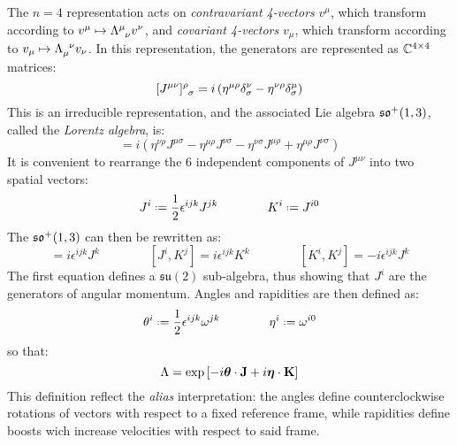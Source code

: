 The $ n = 4 $ representation acts on \textit{contravariant 4-vectors} $ v^\mu $, which transform according to $ v^\mu \mapsto \tensor{\Lambda}{^\mu_\nu} v^\nu $, and \textit{covariant 4-vectors} $ v_\mu $, which transform according to $ v_\mu \mapsto \tensor{\Lambda}{_\mu^\nu} v_\nu $. In this representation, the generators are represented as $ \mathbb{C}^{4 \times 4} $ matrices:
\begin{equation}
  \tensor{[J^{\mu \nu}]}{^\rho_\sigma} = i \left( \eta^{\mu \rho} \delta^\nu_\sigma - \eta^{\nu \rho} \delta^\mu_\sigma \right)
  \label{eq:lor-gen}
\end{equation}
This is an irreducible representation, and the associated Lie algebra $ \mathfrak{so}^+(1,3) $, called the \textit{Lorentz algebra}, is:
\begin{equation}
  [J^{\mu \nu}, J^{\sigma \rho}] = i \left( \eta^{\nu \rho} J^{\mu \sigma} - \eta^{\mu \rho} J^{\nu \sigma} - \eta^{\nu \sigma} J^{\mu \rho} + \eta^{\mu \rho} J^{\nu \sigma} \right)
  \label{eq:lor-comm}
\end{equation}
It is convenient to rearrange the 6 independent components of $ J^{\mu \nu} $ into two spatial vectors:
\begin{equation}
  J^i \defeq \frac{1}{2} \epsilon^{ijk} J^{jk}
  \qquad \qquad
  K^i \defeq J^{i0}
  \label{eq:lor-better-gen}
\end{equation}
The $ \mathfrak{so}^+(1,3) $ can then be rewritten as:
\begin{equation}
  [J^i, J^j] = i \epsilon^{ijk} J^k
  \qquad \qquad
  [J^i, K^j] = i \epsilon^{ijk} K^k
  \qquad \qquad
  [K^i, K^j] = - i \epsilon^{ijk} J^k
\end{equation}
The first equation defines a $ \mathfrak{su}(2) $ sub-algebra, thus showing that $ J^i $ are the generators of angular momentum. Angles and rapidities are then defined as:
\begin{equation}
  \theta^i \defeq \frac{1}{2} \epsilon^{ijk} \omega^{jk}
  \qquad \qquad
  \eta^i \defeq \omega^{i0}
\end{equation}
so that:
\begin{equation}
  \Lambda = \exp \left[ -i \boldsymbol{\theta} \cdot \mathbf{J} + i \boldsymbol{\eta} \cdot \mathbf{K} \right]
  \label{eq:lor-better-transf}
\end{equation}
This definition reflect the \textit{alias} interpretation: the angles define counterclockwise rotations of vectors with respect to a fixed reference frame, while rapidities define boosts wich increase velocities with respect to said frame.

